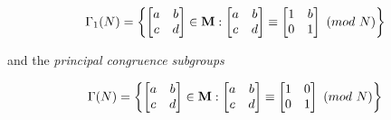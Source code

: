   \[\Gamma_1(N) = \left\{\begin{bmatrix} a&b\\c&d \end{bmatrix} \in \mathbf{M}
      : \begin{bmatrix} a&b\\c&d \end{bmatrix}
      \equiv \begin{bmatrix}1&b\\0&1 \end{bmatrix} \ (\mathnormal{mod}\ N) \right\}\]

  and the \emph{principal congruence subgroups}

  \[\Gamma(N) = \left\{\begin{bmatrix} a&b\\c&d \end{bmatrix} \in \mathbf{M}
      : \begin{bmatrix} a&b\\c&d \end{bmatrix}
      \equiv \begin{bmatrix}1&0\\0&1 \end{bmatrix} \ (\mathnormal{mod}\ N) \right\}\]
